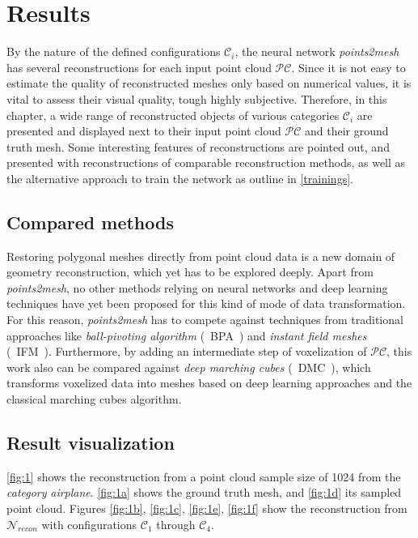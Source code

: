 \chapter{Results}
\label{chap:results}

    By the nature of the defined configurations $\mathcal{C}_i$, the neural network
    \emph{points2mesh} has several reconstructions for each input point cloud $\mathcal{PC}$.
    Since it is not easy to estimate the quality of reconstructed meshes only based on numerical
    values, it is vital to assess their visual quality, tough highly subjective.
    Therefore, in this chapter, a wide range of reconstructed objects of various categories $\mathcal{C}_i$
    are presented and displayed next to their input point cloud $\mathcal{PC}$ and their ground 
    truth mesh. Some interesting features of reconstructions are pointed out, and presented with reconstructions of comparable
    reconstruction methods, as well as the alternative approach to train the network as outline in \ref{trainings}.
    
\section{Compared methods}

Restoring polygonal meshes directly from point cloud data is a new domain of geometry reconstruction, 
which yet has to be explored deeply. Apart from \emph{points2mesh}, no other methods relying on neural 
networks and deep learning techniques have yet been proposed for this kind of mode of data transformation.
For this reason, \emph{points2mesh} has to compete against techniques from traditional approaches like
\emph{ball-pivoting algorithm} \cite{817351}(~BPA~) and \emph{instant field meshes} \cite{Jakob2015Instant} (~IFM~). Furthermore, by adding
an intermediate step of voxelization of $\mathcal{PC}$, this work also can be compared against 
\emph{deep marching cubes} \cite{Liao2018CVPR} (~DMC~), which transforms voxelized data into meshes based on deep learning approaches and the classical
marching cubes algorithm.

\section{Result visualization}
  \ref{fig:1} shows the reconstruction from a point cloud sample size of 1024 from the \emph{category}
  \emph{airplane}. \ref{fig:1a} shows the ground truth mesh, and \ref{fig:1d} its sampled point cloud. Figures
  \ref{fig:1b}, \ref{fig:1c}, \ref{fig:1e}, \ref{fig:1f} show the reconstruction from $\mathcal{N}_{recon}$ with 
  configurations $\mathcal{C}_1$ through $\mathcal{C}_4$.

